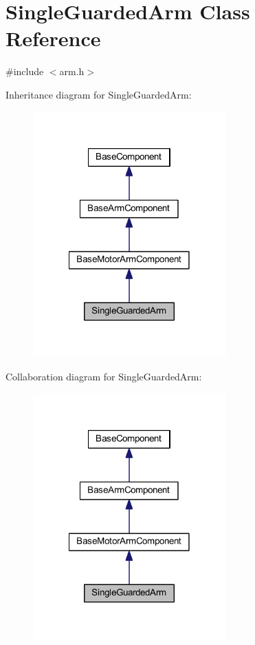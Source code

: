 \hypertarget{class_single_guarded_arm}{\section{\-Single\-Guarded\-Arm \-Class \-Reference}
\label{class_single_guarded_arm}
}


{\ttfamily \#include $<$arm.\-h$>$}



\-Inheritance diagram for \-Single\-Guarded\-Arm\-:\nopagebreak
\begin{figure}[H]
\begin{center}
\leavevmode
\includegraphics[width=210pt]{class_single_guarded_arm__inherit__graph}
\end{center}
\end{figure}


\-Collaboration diagram for \-Single\-Guarded\-Arm\-:\nopagebreak
\begin{figure}[H]
\begin{center}
\leavevmode
\includegraphics[width=210pt]{class_single_guarded_arm__coll__graph}
\end{center}
\end{figure}
